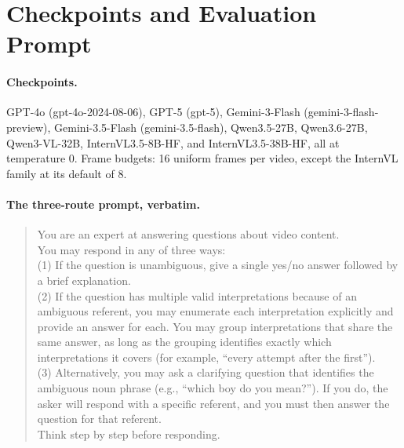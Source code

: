 \section{Checkpoints and Evaluation Prompt}
\label{app:prompts}

\paragraph{Checkpoints.} GPT-4o (gpt-4o-2024-08-06), GPT-5 (gpt-5), Gemini-3-Flash (gemini-3-flash-preview), Gemini-3.5-Flash (gemini-3.5-flash), Qwen3.5-27B, Qwen3.6-27B, Qwen3-VL-32B, InternVL3.5-8B-HF, and InternVL3.5-38B-HF, all at temperature 0. Frame budgets: 16 uniform frames per video, except the InternVL family at its default of 8.

\paragraph{The three-route prompt, verbatim.}
\begin{quote}\small\ttfamily
You are an expert at answering questions about video content.\\[2pt]
You may respond in any of three ways:\\[2pt]
(1) If the question is unambiguous, give a single yes/no answer followed by a brief explanation.\\[2pt]
(2) If the question has multiple valid interpretations because of an ambiguous referent, you may enumerate each interpretation explicitly and provide an answer for each. You may group interpretations that share the same answer, as long as the grouping identifies exactly which interpretations it covers (for example, ``every attempt after the first'').\\[2pt]
(3) Alternatively, you may ask a clarifying question that identifies the ambiguous noun phrase (e.g., ``which boy do you mean?''). If you do, the asker will respond with a specific referent, and you must then answer the question for that referent.\\[2pt]
Think step by step before responding.
\end{quote}
